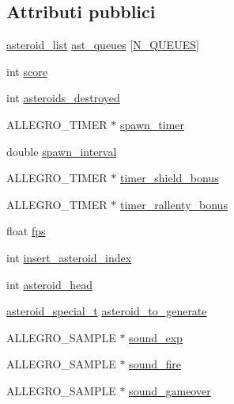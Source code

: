 \subsection*{Attributi pubblici}
\begin{DoxyCompactItemize}
\item 
\hyperlink{data_8h_a452eef9acfcf76fb85e2c7ecf3b9ff90}{asteroid\+\_\+list} \hyperlink{structmatch__vars__t_a71ec4212320d46caf051a7e61addbffe}{ast\+\_\+queues} \mbox{[}\hyperlink{data_8h_abbb1a97343fdbf54e75f14fb83cb0a92}{N\+\_\+\+Q\+U\+E\+U\+ES}\mbox{]}
\item 
int \hyperlink{structmatch__vars__t_aa002d177fd16ff93c89394a68fd469a0}{score}
\item 
int \hyperlink{structmatch__vars__t_ab2a6e3340cca84e388bae6a0bc3e0425}{asteroids\+\_\+destroyed}
\item 
A\+L\+L\+E\+G\+R\+O\+\_\+\+T\+I\+M\+ER $\ast$ \hyperlink{structmatch__vars__t_a3f2d3e6df0eba86392ef88491d1e31bd}{spawn\+\_\+timer}
\item 
double \hyperlink{structmatch__vars__t_a82b9a455eeeb8653c724fb6ab555ab01}{spawn\+\_\+interval}
\item 
A\+L\+L\+E\+G\+R\+O\+\_\+\+T\+I\+M\+ER $\ast$ \hyperlink{structmatch__vars__t_a98409cabd79c20cd80959cb2242e683c}{timer\+\_\+shield\+\_\+bonus}
\item 
A\+L\+L\+E\+G\+R\+O\+\_\+\+T\+I\+M\+ER $\ast$ \hyperlink{structmatch__vars__t_a943d3f8a5a80e3840b4c034893ad3d72}{timer\+\_\+rallenty\+\_\+bonus}
\item 
float \hyperlink{structmatch__vars__t_a1b8a66b48d6fb51e5bcdfd6c66da1102}{fps}
\item 
int \hyperlink{structmatch__vars__t_a8b93e95f0caf4fa72707e6e234446751}{insert\+\_\+asteroid\+\_\+index}
\item 
int \hyperlink{structmatch__vars__t_a19eb567824590a0ae36be4ed146c1a89}{asteroid\+\_\+head}
\item 
\hyperlink{data_8h_a07b940e2e86eb4fc3f1e1e1843da0564}{asteroid\+\_\+special\+\_\+t} \hyperlink{structmatch__vars__t_a776555bc52d4be60612230e4735fe467}{asteroid\+\_\+to\+\_\+generate}
\item 
A\+L\+L\+E\+G\+R\+O\+\_\+\+S\+A\+M\+P\+LE $\ast$ \hyperlink{structmatch__vars__t_aefc460782c12de4ae0c1fdbd9f7c531d}{sound\+\_\+exp}
\item 
A\+L\+L\+E\+G\+R\+O\+\_\+\+S\+A\+M\+P\+LE $\ast$ \hyperlink{structmatch__vars__t_ac379900bede23a881327a9951a020dc6}{sound\+\_\+fire}
\item 
A\+L\+L\+E\+G\+R\+O\+\_\+\+S\+A\+M\+P\+LE $\ast$ \hyperlink{structmatch__vars__t_a31831089835f2f553993d69e4c0c3d1b}{sound\+\_\+gameover}

\end{DoxyCompactItemize}
